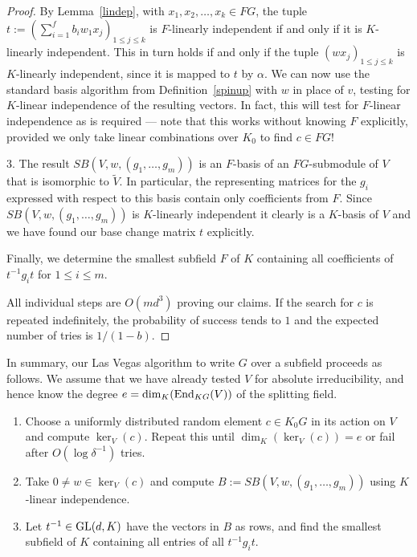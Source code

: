 \begin{proof}
By Lemma~\ref{lindep}, with $x_1, x_2, \ldots, x_k \in FG$,
the tuple $t := (\sum_{i=1}^f b_i w_1 x_j)_{1 \le j \le k}$ is $F$-linearly
independent if and only if it is $K$-linearly independent. 
This in turn holds if and only if the tuple 
$(w x_j)_{1 \le j \le k}$ is $K$-linearly independent, since it is 
mapped to $t$ by $\alpha$. We can now use the standard basis 
algorithm from Definition~\ref{spinup}
with $w$ in place of $v$, testing for 
$K$-linear independence of the resulting vectors. In fact,
this will test for $F$-linear independence as is required 
--- note that this works without knowing $F$ explicitly, provided we
only take linear combinations over $K_0$ to find
$c \in FG$!

3. The result $SB(V,w,(g_1, \ldots, g_m))$  is an $F$-basis of an $FG$-submodule
of $V$ that is isomorphic to $\tilde{V}$. In particular, the representing
matrices for the $g_i$ expressed with respect to this basis contain
only coefficients from $F$. Since $SB(V,w,(g_1, \ldots, g_m))$ is 
$K$-linearly independent
it clearly is a $K$-basis of $V$ and we have found our base change
matrix $t$ explicitly.

Finally, we
 determine the smallest subfield $F$ of $K$ containing all
coefficients of $t^{-1}g_it$ for $1 \leq i \leq m$.

    All individual steps are $O(md^3)$ proving our claims.
If the search for $c$
 is repeated indefinitely, the probability of success tends to $1$
    and the expected number of tries is $1/(1-b)$.
\end{proof}

\noindent
In summary, our Las Vegas 
algorithm to write $G$ over a subfield proceeds as follows.
We assume that we have already tested $V$ for absolute irreducibility, 
and hence know the degree $e = \dim_K(\End_{KG}(V))$ of the splitting
field.
\begin{enumerate}
\item Choose a uniformly distributed random element $c \in K_0 G$
    in its action on $V$ and compute $\ker_V(c)$.
Repeat this until $\dim_K(\ker_V(c)) = e$ or 
fail after $O(\log \delta^{-1})$ tries. 
\item Take $0 \neq w \in \ker_V(c)$ and compute $B := SB(V,w,(g_1, \ldots,
g_m))$ using $K$-linear independence.
\item Let $t^{-1} \in \GL(d,K)$ have the vectors in $B$ as rows, and
find the smallest subfield of $K$ containing all entries of all
$t^{-1}g_it$.
\end{enumerate}

